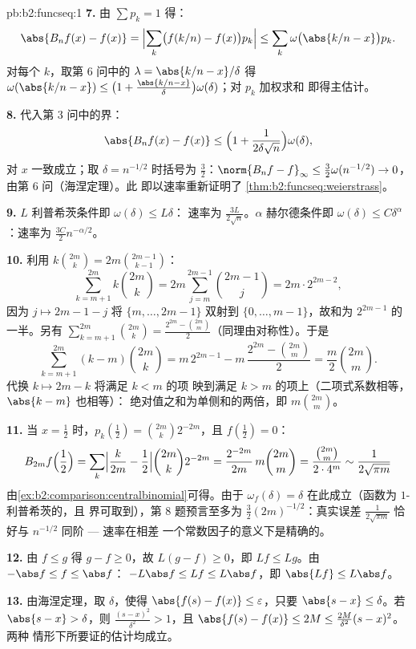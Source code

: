 \begin{solution}{pb:b2:funcseq:1}
\textbf{7.} 由 $\sum p_k = 1$ 得：
\[
\abs{B_nf(x) - f(x)}
= \Bigl|\sum_k\bigl(f(k/n) - f(x)\bigr)p_k\Bigr|
\leq \sum_k\omega\bigl(\abs{k/n - x}\bigr)p_k .
\]
对每个 $k$，取第 6 问中的 $\lambda = \abs{k/n - x}/\delta$
得 $\omega(\abs{k/n-x}) \leq \bigl(1 +
\frac{\abs{k/n-x}}\delta\bigr)\omega(\delta)$；对 $p_k$ 加权求和
即得主估计。

\textbf{8.} 代入第 3 问中的界：
\[
\abs{B_nf(x) - f(x)} \leq \Bigl(1 +
\frac{1}{2\delta\sqrt n}\Bigr)\omega(\delta),
\]
对 $x$ 一致成立；取 $\delta = n^{-1/2}$ 时括号为
$\frac32$：$\norm{B_nf - f}_\infty \leq
\frac32\omega(n^{-1/2}) \to 0$，由第 6 问（海涅定理）。此
即以速率重新证明了 \cref{thm:b2:funcseq:weierstrass}。

\textbf{9.} $L$ 利普希茨条件即 $\omega(\delta) \leq L\delta$：
速率为 $\frac{3L}{2\sqrt n}$。$\alpha$ 赫尔德条件即
$\omega(\delta) \leq C\delta^\alpha$：速率为 $\frac{3C}{2}
n^{-\alpha/2}$。

\textbf{10.} 利用 $k\binom{2m}k = 2m\binom{2m-1}{k-1}$：
\[
\sum_{k=m+1}^{2m}k\binom{2m}k
= 2m\sum_{j=m}^{2m-1}\binom{2m-1}{j}
= 2m\cdot 2^{2m-2},
\]
因为 $j \mapsto 2m-1-j$ 将 $\{m,\dots,2m-1\}$ 双射到
$\{0,\dots,m-1\}$，故和为 $2^{2m-1}$ 的一半。另有
$\sum_{k=m+1}^{2m}\binom{2m}k = \frac{2^{2m} -
\binom{2m}m}{2}$（同理由对称性）。于是
\[
\sum_{k=m+1}^{2m}(k-m)\binom{2m}k
= m\,2^{2m-1} - m\,\frac{2^{2m} - \binom{2m}m}{2}
= \frac m2\binom{2m}m .
\]
代换 $k \mapsto 2m-k$ 将满足 $k < m$ 的项
映到满足 $k > m$ 的项上（二项式系数相等，$\abs{k-m}$ 也相等）：
绝对值之和为单侧和的两倍，即 $m\binom{2m}m$。

\textbf{11.} 当 $x = \frac12$ 时，$p_k(\tfrac12) =
\binom{2m}k2^{-2m}$，且 $f(\tfrac12) = 0$：
\[
B_{2m}f\Bigl(\frac12\Bigr)
= \sum_k\Bigl|\frac{k}{2m} - \frac12\Bigr|
\binom{2m}k 2^{-2m}
= \frac{2^{-2m}}{2m}\,m\binom{2m}m
= \frac{\binom{2m}m}{2\cdot4^m}
\sim \frac{1}{2\sqrt{\pi m}}
\]
由\cref{ex:b2:comparison:centralbinomial}可得。由于 $\omega_f
(\delta) = \delta$ 在此成立（函数为 $1$-利普希茨的，且
界可取到），第 8 题预言至多为
$\frac32(2m)^{-1/2}$：真实误差 $\frac{1}{2\sqrt{\pi m}}$
恰好与 $n^{-1/2}$ 同阶 --- 速率在相差
一个常数因子的意义下是精确的。

\textbf{12.} 由 $f \leq g$ 得 $g - f \geq 0$，故 $L(g-f) \geq
0$，即 $Lf \leq Lg$。由 $-\abs f \leq f \leq \abs f$：
$-L\abs f \leq Lf \leq L\abs f$，即 $\abs{Lf} \leq
L\abs f$。

\textbf{13.} 由海涅定理，取 $\delta$，使得 $\abs{f(s)-f(x)}
\leq \varepsilon$，只要 $\abs{s-x} \leq \delta$。若
$\abs{s - x} > \delta$，则 $\frac{(s-x)^2}{\delta^2} > 1$，且
$\abs{f(s)-f(x)} \leq 2M \leq \frac{2M}{\delta^2}(s-x)^2$。两种
情形下所要证的估计均成立。


\end{solution}
